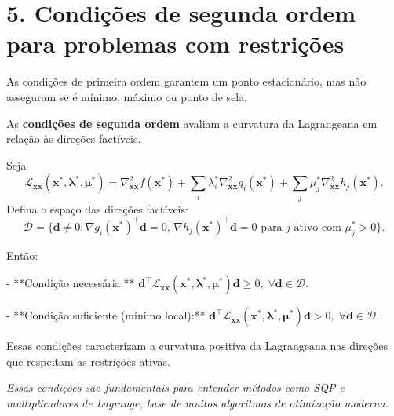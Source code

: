 \documentclass[9pt,a4paper]{extarticle}
\begin{document}
\vspace{1em}

\section*{5. Condições de segunda ordem para problemas com restrições}

As condições de primeira ordem garantem um ponto estacionário, mas não asseguram se é mínimo, máximo ou ponto de sela.

As \textbf{condições de segunda ordem} avaliam a curvatura da Lagrangeana em relação às direções factíveis.

Seja
\[
\mathcal{L}_{\bm{x}\bm{x}}(\bm{x}^*, \bm{\lambda}^*, \bm{\mu}^*) = \nabla_{\bm{x}\bm{x}}^2 f(\bm{x}^*) + \sum_i \lambda_i^* \nabla_{\bm{x}\bm{x}}^2 g_i(\bm{x}^*) + \sum_j \mu_j^* \nabla_{\bm{x}\bm{x}}^2 h_j(\bm{x}^*).
\]
Defina o espaço das direções factíveis:
\[
\mathcal{D} = \{\bm{d} \neq 0 : \nabla g_i(\bm{x}^*)^\top \bm{d} = 0, \, \nabla h_j(\bm{x}^*)^\top \bm{d} = 0 \text{ para } j \text{ ativo com } \mu_j^* > 0\}.
\]

Então:

- **Condição necessária:**  
  \(\bm{d}^\top \mathcal{L}_{\bm{x}\bm{x}}(\bm{x}^*, \bm{\lambda}^*, \bm{\mu}^*) \bm{d} \ge 0, \; \forall \bm{d} \in \mathcal{D}.\)

- **Condição suficiente (mínimo local):**  
  \(\bm{d}^\top \mathcal{L}_{\bm{x}\bm{x}}(\bm{x}^*, \bm{\lambda}^*, \bm{\mu}^*) \bm{d} > 0, \; \forall \bm{d} \in \mathcal{D}.\)

Essas condições caracterizam a curvatura positiva da Lagrangeana nas direções que respeitam as restrições ativas.

\vspace{1em}

\begin{center}
\textit{Essas condições são fundamentais para entender métodos como SQP e multiplicadores de Lagrange, base de muitos algoritmos de otimização moderna.}
\end{center}
\end{document}
